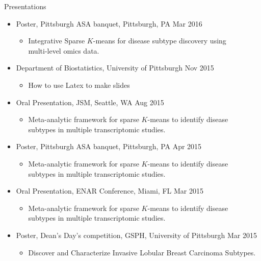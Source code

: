 \documentclass{resume} %
\begin{document}
\begin{rSection}{Presentations}
\begin{itemize}[noitemsep,topsep=0pt]
\item Poster, Pittsburgh ASA banquet, Pittsburgh, PA \hfill {Mar 2016}
\begin{itemize}[noitemsep,topsep=0pt]
\item{Integrative Sparse $K$-means for disease subtype discovery using \\multi-level omics data.}
\end{itemize}

\item Department of Biostatistics, University of Pittsburgh  \hfill Nov 2015
\begin{itemize}[noitemsep,topsep=0pt]
\item{How to use Latex to make slides}
\end{itemize}

\item Oral Presentation, JSM, Seattle, WA \hfill {Aug 2015}
\begin{itemize}[noitemsep,topsep=0pt]
\item{Meta-analytic framework for sparse $K$-means to identify disease\\ subtypes in multiple transcriptomic studies.}
\end{itemize}

\item Poster, Pittsburgh ASA banquet, Pittsburgh, PA \hfill {Apr 2015}
\begin{itemize}[noitemsep,topsep=0pt]
\item{Meta-analytic framework for sparse $K$-means to identify disease\\ subtypes in multiple transcriptomic studies.}
\end{itemize}

\item Oral Presentation, ENAR Conference, Miami, FL \hfill {Mar 2015}
\begin{itemize}[noitemsep,topsep=0pt]
\item{Meta-analytic framework for sparse $K$-means to identify disease\\ subtypes in multiple transcriptomic studies.}
\end{itemize}

\item Poster, Dean's Day's competition, GSPH, University of Pittsburgh \hfill {Mar 2015}
\begin{itemize}[noitemsep,topsep=0pt]
\item{Discover and Characterize Invasive Lobular Breast Carcinoma Subtypes.}
\end{itemize}


\end{itemize}
\end{rSection}
\end{document}
